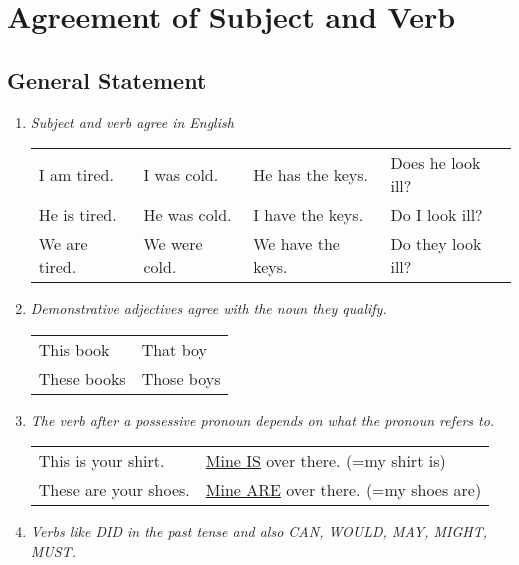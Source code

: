 \section{Agreement of Subject and Verb}

\subsection{General Statement}

\begin{enumerate}
    \item
        {\it
        Subject and verb agree in English
        }
        \newline
        \newline
        \begin{tabular}{llll}
            I am tired. & I was cold. & He has the keys. & Does he look ill? \\
            He is tired. & He was cold. & I have the keys. & Do I look ill? \\
            We are tired. & We were cold. & We have the keys. & Do they look ill?
        \end{tabular}
    \item
        {\it
        Demonstrative adjectives agree with the noun they qualify.
        }
        \newline
        \newline
        \begin{tabular}{ll}
            This book & That boy \\
            These books & Those boys
        \end{tabular}
    \item
        {\it
        The verb after a possessive pronoun depends on what the pronoun refers to.
        }
        \newline
        \newline
        \begin{tabular}{ll}
            This is your shirt. & \underline{Mine IS} over there. (=my shirt is) \\
            These are your shoes. & \underline{Mine ARE} over there. (=my shoes are)
        \end{tabular}
    \item
        {\it
        Verbs like DID in the past tense and also CAN, WOULD, MAY, MIGHT, MUST.
        }
        \newline
        \newline
\end{enumerate}

